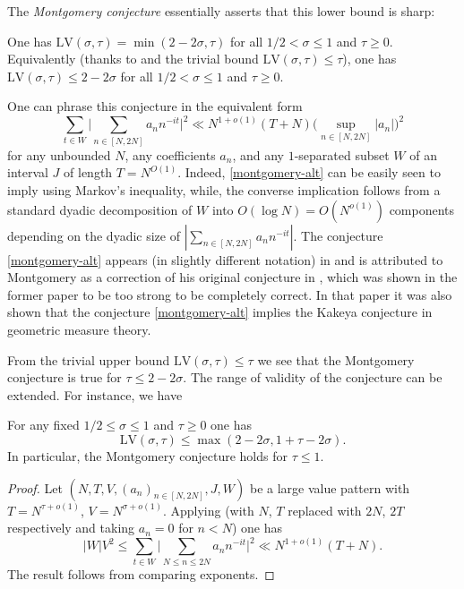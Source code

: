 \documentclass[a4paper, 10pt]{amsart}
\newcommand{\LV}{\mathrm{LV}}
\begin{document}
The \emph{Montgomery conjecture} essentially asserts that this lower bound is sharp:

\begin{conjecture}\label{montgomery-conj'}
One has $\LV(\sigma, \tau) = \min(2 - 2 \sigma,\tau)$ for all $1/2 < \sigma \leq 1$ and $\tau \geq 0$.  Equivalently (thanks to  and the trivial bound $\LV(\sigma,\tau) \leq \tau$), one has $\LV(\sigma,\tau) \leq 2-2\sigma$ for all $1/2 < \sigma \leq 1$ and $\tau \geq 0$.
\end{conjecture}

One can phrase this conjecture in the equivalent form
\begin{equation}\label{montgomery-alt}
     \sum_{t \in W} \bigg|\sum_{n \in [N,2N]} a_n n^{-it}\bigg|^2 \ll N^{1+o(1)} (T + N) \bigg(\sup_{n \in [N,2N]} |a_n|\bigg)^2
\end{equation}
for any unbounded $N$, any coefficients $a_n$, and any $1$-separated subset $W$ of an interval $J$ of length $T = N^{O(1)}$. Indeed, \eqref{montgomery-alt} can be easily seen to imply  using Markov's inequality, while, the converse implication follows from a standard dyadic decomposition of $W$ into $O(\log N) = O(N^{o(1)})$ components depending on the dyadic size of $|\sum_{n \in [N,2N]} a_n n^{-it}|$. The conjecture \eqref{montgomery-alt} appears (in slightly different notation) in \cite[(1.6)]{bourgain_montgomery_1991} and is attributed to Montgomery as a correction of his original conjecture in \cite{montgomery_topics_1971}, which was shown in the former paper to be too strong to be completely correct.  In that paper it was also shown that the conjecture \eqref{montgomery-alt} implies the Kakeya conjecture in geometric measure theory.

From the trivial upper bound $\LV(\sigma,\tau) \leq \tau$ we see that the Montgomery conjecture is true for $\tau \leq 2-2\sigma$.  The range of validity of the conjecture can be extended.  For instance, we have

\begin{theorem}\label{l2-mvt} For any fixed $1/2 \leq \sigma \leq 1$ and $\tau\geq 0$ one has
    $$ \LV(\sigma,\tau) \leq \max( 2-2\sigma, 1 + \tau - 2 \sigma).$$
In particular, the Montgomery conjecture holds for $\tau \leq 1$.
\end{theorem}

\begin{proof}
Let $(N,T,V,(a_n)_{n \in [N,2N]},J,W)$ be a large value pattern with $T = N^{\tau + o(1)}$, $V = N^{\sigma + o(1)}$. Applying \cite[Theorem~9.4]{ik} (with $N$, $T$ replaced with $2N$, $2T$ respectively and taking $a_n = 0$ for $n < N$) one has
\[
|W|V^2 \le \sum_{t \in W} \bigg|\sum_{N \le n \le 2N} a_n n^{-it}\bigg|^2 \ll N^{1 + o(1)}(T + N).
\]
The result follows from comparing exponents.
\end{proof}
\end{document}
